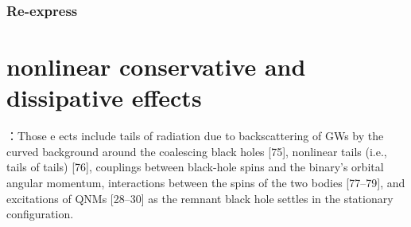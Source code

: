 \documentclass[CJK]{paper}  %
\begin{document}
\subsubsection{Re-express}


\newpage
\section{nonlinear conservative and dissipative effects}
\par \cite{test_GR_GW150914}：Those
 e ects include tails of radiation due to backscattering of GWs
 by the curved background around the coalescing black holes
 [75], nonlinear tails (i.e., tails of tails) [76], couplings between
 black-hole spins and the binary’s orbital angular momentum,
 interactions between the spins of the two bodies [77–79], and
 excitations of QNMs [28–30] as the remnant black hole settles
 in the stationary configuration.





\newpage


\end{document}
